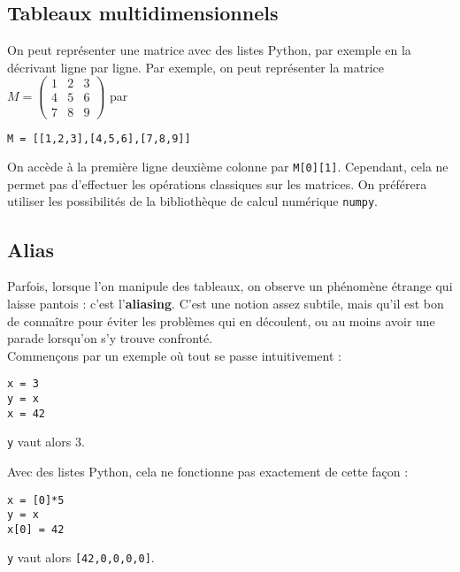 \subsection{Tableaux multidimensionnels}

On peut représenter une matrice avec des listes Python, par exemple en la décrivant ligne par 
ligne. 
Par exemple, on peut représenter la matrice 
$
  M=\begin{pmatrix}
    1&2&3 \\ 4&5&6 \\ 7&8&9
  \end{pmatrix}
$
par
\begin{lstlisting}
M = [[1,2,3],[4,5,6],[7,8,9]]
\end{lstlisting}
On accède à la première ligne deuxième colonne par \texttt{M[0][1]}.
Cependant, cela ne permet pas d'effectuer les opérations classiques sur les matrices. On préférera 
utiliser les possibilités de la bibliothèque de calcul numérique \texttt{numpy}.

\subsection{Alias}

Parfois, lorsque l'on manipule des tableaux, on observe un phénomène étrange qui laisse pantois : 
c'est l'\textbf{aliasing}. C'est une notion assez subtile, mais qu'il est bon de connaître pour 
éviter les problèmes qui en découlent, ou au moins avoir une parade lorsqu'on s'y trouve 
confronté.\\


Commençons par un exemple où tout se passe intuitivement :
\begin{lstlisting}
x = 3
y = x
x = 42
\end{lstlisting}

\texttt{y} vaut alors 3. 

Avec des listes Python, cela ne fonctionne pas exactement de cette façon : 
\begin{lstlisting}
x = [0]*5
y = x
x[0] = 42
\end{lstlisting}
\texttt{y} vaut alors \texttt{[42,0,0,0,0]}.

